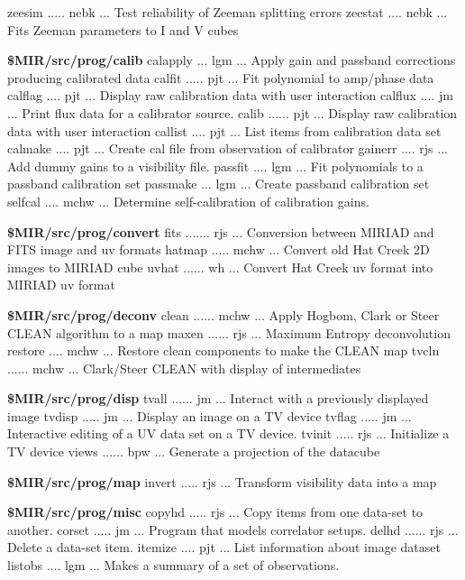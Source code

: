 {\eightpoint\begintt
zeesim ..... nebk ... Test reliability of Zeeman splitting errors 
zeestat .... nebk ... Fits Zeeman parameters to I and V cubes 
\endtt}
\par{\bf \$MIR/src/prog/calib}
{\eightpoint\begintt
calapply ... lgm  ... Apply gain and passband corrections producing calibrated data 
calfit ..... pjt  ... Fit polynomial to amp/phase data 
calflag .... pjt  ... Display raw calibration data with user interaction 
calflux .... jm   ... Print flux data for a calibrator source. 
calib ...... pjt  ... Display raw calibration data with user interaction 
\endtt}
{\eightpoint\begintt
callist .... pjt  ... List items from calibration data set 
calmake .... pjt  ... Create cal file from observation of calibrator 
gainerr .... rjs  ... Add dummy gains to a visibility file. 
passfit .... lgm  ... Fit polynomials to a passband calibration set 
passmake ... lgm  ... Create passband calibration set 
\endtt}
{\eightpoint\begintt
selfcal .... mchw ... Determine self-calibration of calibration gains. 
\endtt}
\par{\bf \$MIR/src/prog/convert}
{\eightpoint\begintt
fits ....... rjs  ... Conversion between MIRIAD and FITS image and uv formats 
hatmap ..... mchw ... Convert old Hat Creek 2D images to MIRIAD cube 
uvhat ...... wh   ... Convert Hat Creek uv format into MIRIAD uv format 
\endtt}
\par{\bf \$MIR/src/prog/deconv}
{\eightpoint\begintt
clean ...... mchw ... Apply Hogbom, Clark or Steer CLEAN algorithm to a map 
maxen ...... rjs  ... Maximum Entropy deconvolution 
restore .... mchw ... Restore clean components to make the CLEAN map 
tvcln ...... mchw ... Clark/Steer CLEAN with display of intermediates 
\endtt}
\par{\bf \$MIR/src/prog/disp}
{\eightpoint\begintt
tvall ...... jm   ... Interact with a previously displayed image 
tvdisp ..... jm   ... Display an image on a TV device 
tvflag ..... jm   ... Interactive editing of a UV data set on a TV device. 
tvinit ..... rjs  ... Initialize a TV device 
views ...... bpw  ... Generate a projection of the datacube 
\endtt}
\par{\bf \$MIR/src/prog/map}
{\eightpoint\begintt
invert ..... rjs  ... Transform visibility data into a map 
\endtt}
\par{\bf \$MIR/src/prog/misc}
{\eightpoint\begintt
copyhd ..... rjs  ... Copy items from one data-set to another. 
corset ..... jm   ... Program that models correlator setups. 
delhd ...... rjs  ... Delete a data-set item. 
itemize .... pjt  ... List information about image dataset 
listobs .... lgm  ... Makes a summary of a set of observations. 
\endtt}
